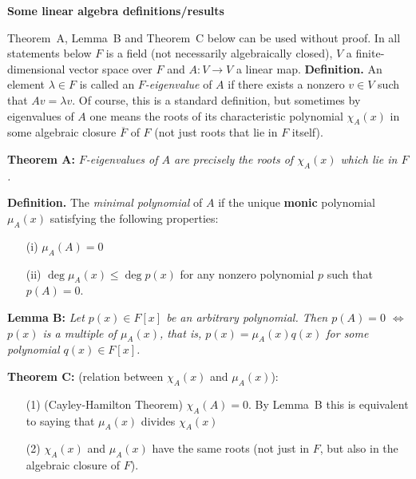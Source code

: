 \documentclass[12pt]{amsart}
\begin{document}
\newpage
\centerline{\bf Some linear algebra definitions/results}
\skv
Theorem~A, Lemma~B and Theorem~C below can be used without proof. In all statements below $F$ is a field (not necessarily algebraically closed), $V$ a finite-dimensional vector space over $F$ 
and $A:V\to V$ a linear map.
\skv
{\bf Definition. }\rm An element $\lambda\in F$ is called an {\it $F$-eigenvalue} of $A$ if there exists a nonzero $v\in V$
such that $Av=\lambda v$. 
\skv
Of course, this is a standard definition, but sometimes by eigenvalues of $A$ one means the roots of its characteristic polynomial
$\chi_A(x)$ in some algebraic closure $\overline F$ of $F$ (not just roots that lie in $F$ itself).

\skv
{\bf Theorem A: }\it $F$-eigenvalues of $A$ are precisely the roots of $\chi_A(x)$ which lie in $F$. \rm
\skv

{\bf Definition. }\rm The {\it minimal polynomial} of $A$ if the unique {\bf monic} polynomial $\mu_A(x)$ satisfying the following properties:

\begin{itemize}
\item[(i)] $\mu_A(A)=0$
\item[(ii)] $\deg \mu_A(x)\leq \deg p(x)$ for any nonzero polynomial $p$ such that $p(A)=0$. 
\end{itemize}

\skv
{\bf Lemma B: }\it Let $p(x)\in F[x]$ be an arbitrary polynomial. Then $p(A)=0$ $\iff$ $p(x)$ is a multiple of $\mu_A(x)$,
that is, $p(x)=\mu_A(x)q(x)$ for some polynomial $q(x)\in F[x]$.\rm
\skv

\skv
{\bf Theorem C: } (relation between $\chi_A(x)$ and $\mu_A(x)$):\it
\begin{itemize}
\item[(1)] (Cayley-Hamilton Theorem) $\chi_A(A)=0$. By Lemma~B this is equivalent to saying that $\mu_A(x)$ divides $\chi_A(x)$
\item[(2)] $\chi_A(x)$ and $\mu_A(x)$ have the same roots (not just in $F$, but also in the algebraic closure of $F$).
\end{itemize}
\end{document}
